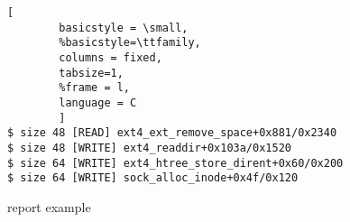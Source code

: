 \begin{figure}[t]
\begin{adjustbox}{width=\linewidth}
        \begin{lstlisting}[
        basicstyle = \small,
        %basicstyle=\ttfamily,
        columns = fixed,
        tabsize=1,
        %frame = l,
        language = C
        ]
$ size 48 [READ] ext4_ext_remove_space+0x881/0x2340
$ size 48 [WRITE] ext4_readdir+0x103a/0x1520
$ size 64 [WRITE] ext4_htree_store_dirent+0x60/0x200
$ size 64 [WRITE] sock_alloc_inode+0x4f/0x120
        \end{lstlisting}
\end{adjustbox}
        \caption{\dkasan report example}
        \label{fig:dkasan-report}
\end{figure}
